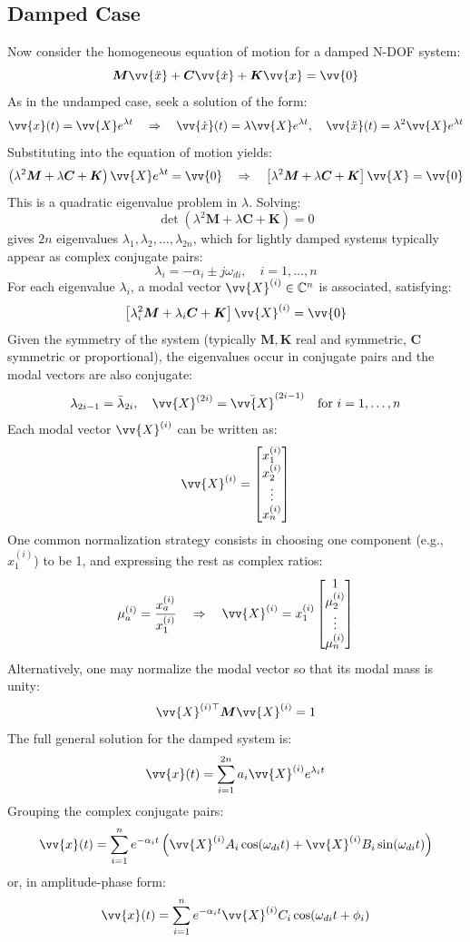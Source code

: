 \subsection{Damped Case}

Now consider the homogeneous equation of motion for a damped N-DOF system:
\[
\boldsymbol{M} \vv{\ddot{x}} + \boldsymbol{C} \vv{\dot{x}} + \boldsymbol{K} \vv{x} = \vv{0}
\]
As in the undamped case, seek a solution of the form:
\[
\vv{x}(t) = \vv{X} e^{\lambda t}
\quad \Rightarrow \quad
\vv{\dot{x}}(t) = \lambda \vv{X} e^{\lambda t}, \quad
\vv{\ddot{x}}(t) = \lambda^2 \vv{X} e^{\lambda t}
\]
Substituting into the equation of motion yields:
\[
\left( \lambda^2 \boldsymbol{M} + \lambda \boldsymbol{C} + \boldsymbol{K} \right) \vv{X} e^{\lambda t} = \vv{0}
\quad \Rightarrow \quad
\left[ \lambda^2 \boldsymbol{M} + \lambda \boldsymbol{C} + \boldsymbol{K} \right] \vv{X} = \vv{0}
\]
This is a quadratic eigenvalue problem in \( \lambda \). Solving:
\[
\det\left( \lambda^2 \boldsymbol{M} + \lambda \boldsymbol{C} + \boldsymbol{K} \right) = 0
\]
gives \( 2n \) eigenvalues \( \lambda_1, \lambda_2, \dots, \lambda_{2n} \), which for lightly damped systems typically appear as complex conjugate pairs:
\[
\lambda_i = -\alpha_i \pm j \omega_{di}, \quad i = 1, \dots, n
\]
For each eigenvalue \( \lambda_i \), a modal vector \( \vv{X}^{(i)} \in \mathbb{C}^n \) is associated, satisfying:
\[
\left[ \lambda_i^2 \boldsymbol{M} + \lambda_i \boldsymbol{C} + \boldsymbol{K} \right] \vv{X}^{(i)} = \vv{0}
\]
Given the symmetry of the system (typically \( \boldsymbol{M}, \boldsymbol{K} \) real and symmetric, \( \boldsymbol{C} \) symmetric or proportional), the eigenvalues occur in conjugate pairs and the modal vectors are also conjugate:
\[
\lambda_{2i-1} = \bar{\lambda}_{2i}, \quad
\vv{X}^{(2i)} = \bar{\vv{X}}^{(2i-1)} \quad \text{for } i = 1, \dots, n
\]
Each modal vector \( \vv{X}^{(i)} \) can be written as:
\[
\vv{X}^{(i)} = 
\begin{bmatrix}
x_1^{(i)} \\
x_2^{(i)} \\
\vdots \\
x_n^{(i)}
\end{bmatrix}
\]
One common normalization strategy consists in choosing one component (e.g., \( x_1^{(i)} \)) to be 1, and expressing the rest as complex ratios:
\[
\mu_a^{(i)} = \frac{x_a^{(i)}}{x_1^{(i)}}
\quad \Rightarrow \quad
\vv{X}^{(i)} = x_1^{(i)}
\begin{bmatrix}
1 \\
\mu_2^{(i)} \\
\vdots \\
\mu_n^{(i)}
\end{bmatrix}
\]
Alternatively, one may normalize the modal vector so that its modal mass is unity:
\[
\vv{X}^{(i)\top} \boldsymbol{M} \vv{X}^{(i)} = 1
\]
The full general solution for the damped system is:
\[
\vv{x}(t) = \sum_{i=1}^{2n} a_i \vv{X}^{(i)} e^{\lambda_i t}
\]
Grouping the complex conjugate pairs:
\[
\vv{x}(t) = \sum_{i=1}^n e^{-\alpha_i t} \left( 
    \vv{X}^{(i)} A_i \cos(\omega_{di} t) + \vv{X}^{(i)} B_i \sin(\omega_{di} t)
\right)
\]
or, in amplitude-phase form:
\[
\vv{x}(t) = \sum_{i=1}^n e^{-\alpha_i t} \vv{X}^{(i)} C_i \cos(\omega_{di} t + \phi_i)
\]

